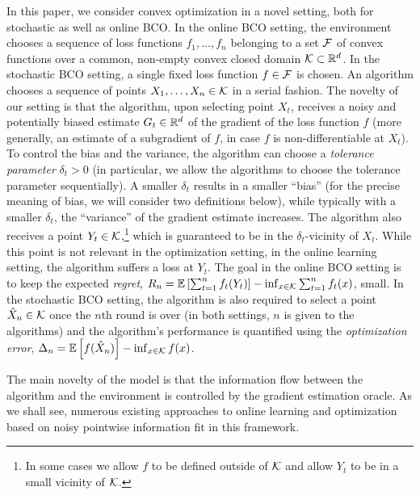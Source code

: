 In this paper, we consider convex optimization in a novel setting, both for stochastic as well as online BCO.
In the online BCO setting, the environment chooses a sequence of loss functions $f_1,\dots,f_n$ belonging to a set $\mathcal{F}$ of convex functions over a common, non-empty convex closed domain $\mathcal{K}\subset \mathbb{R}^d$.
In the stochastic BCO setting, a single fixed loss function $f\in \mathcal{F}$ is chosen.
An algorithm chooses a sequence of points $X_1,\dots,X_n\in \mathcal{K}$ in a serial fashion.
The novelty of our setting is that the algorithm, upon selecting point $X_t$, receives
a noisy and potentially biased estimate $G_t\in \mathbb{R}^d$
of the gradient of the loss function $f$
(more generally, an estimate of a subgradient of $f$, in case $f$ is non-differentiable at $X_t$).
To control the bias and the variance, the algorithm can choose a \emph{tolerance parameter} $\delta_t>0$
(in particular, we allow the algorithms to choose the tolerance parameter sequentially).
A smaller $\delta_t$ results in a smaller ``bias'' (for the precise meaning of bias, we will consider two definitions below), while typically with a smaller $\delta_t$, the ``variance'' of the gradient estimate increases.
The algorithm also receives a point $Y_t\in \mathcal{K}$,\footnote{In some cases we allow $f$ to be defined outside of $\mathcal{K}$ and allow $Y_t$ to be in a small vicinity of $\mathcal{K}$.} which is guaranteed to be in the $\delta_t$-vicinity of $X_t$.
While this point is not relevant in the optimization setting, in the online learning setting,
the algorithm suffers a loss at $Y_t$.
The goal in the online BCO setting is to keep the expected \emph{regret},
	$R_n =\mathbb{E}\left[ \sum_{t=1}^n f_t(Y_t)\right] - \inf_{x\in \mathcal{K}} \sum_{t=1}^n f_t(x)$,
small.
In the stochastic BCO setting, the algorithm is also required to select a point $\hat{X}_n\in \mathcal{K}$ once
the $n$th round is over (in both settings, $n$ is given to the algorithms)
and the algorithm's performance is quantified using the \emph{optimization error},
$\Delta_n = \mathbb{E}\left[f(\hat{X}_n)\right] - \inf_{x\in \mathcal{K}} f(x) $.

The main novelty of the model is that the information flow between the algorithm and the environment is controlled by the gradient estimation oracle. As we shall see, numerous existing approaches to online learning and optimization based on noisy pointwise information fit in this framework.


